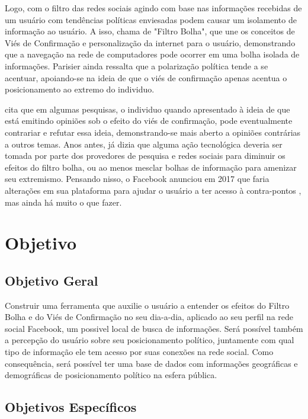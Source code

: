 \documentclass[
	12pt,				%
	oneside,			%
	a4paper,			%
	english,			%
	brazil				%
	]{abntex2ppgsi}
\begin{document}
Logo, com o filtro das redes sociais agindo com base nas informações recebidas de um usuário com tendências políticas enviesadas podem causar um isolamento de informação ao usuário. A isso,  chama de "Filtro Bolha", que une os conceitos de Viés de Confirmação e personalização da internet para o usuário, demonstrando que a navegação na rede de computadores pode ocorrer em uma bolha isolada de informações. Parisier ainda ressalta que a polarização política tende a se acentuar, apoiando-se na ideia de que o viés de confirmação apenas acentua o posicionamento ao extremo do individuo. 

 cita que em algumas pesquisas, o individuo quando apresentado à ideia de que está emitindo opiniões sob o efeito do viés de confirmação, pode eventualmente contrariar e refutar essa ideia, demonstrando-se mais aberto a opiniões contrárias a outros temas. Anos antes,  já dizia que alguma ação tecnológica deveria ser tomada por parte dos provedores de pesquisa e redes sociais para diminuir os efeitos do filtro bolha, ou ao menos mesclar bolhas de informação para amenizar seu extremismo. Pensando nisso, o Facebook anunciou em 2017 que faria alterações em sua plataforma para ajudar o usuário a ter acesso à contra-pontos \cite{facebook_related}, mas ainda há muito o que fazer.


\chapter{Objetivo}
\section{Objetivo Geral}

Construir uma ferramenta que auxilie o usuário a entender os efeitos do Filtro Bolha e do Viés de Confirmação no seu dia-a-dia, aplicado ao seu perfil na rede social Facebook, um possivel local de busca de informações. Será possível também a percepção do usuário sobre seu posicionamento político, juntamente com qual tipo de informação ele tem acesso por suas conexões na rede social. Como consequência, será possível ter uma base de dados com informações geográficas e demográficas de posicionamento político na esfera pública. 


\section{Objetivos Específicos}
\end{document}
